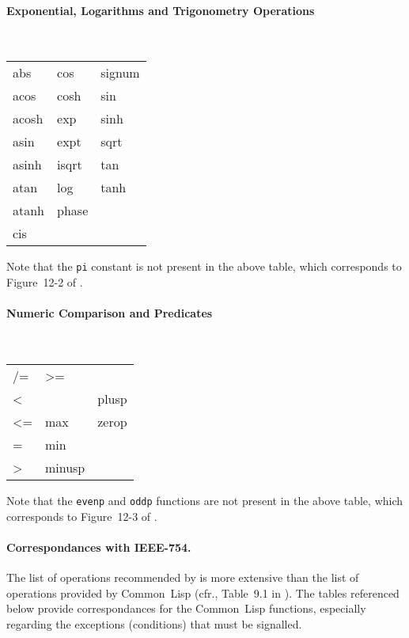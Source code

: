 \documentclass[10pt,fleqn]{article}
\newcommand{\CL}{\textsf{Common~Lisp}}
\newcommand{\code}[1]{\texttt{#1}}
\begin{document}
\paragraph{Exponential, Logarithms and Trigonometry Operations} ~\\

\begin{tt}
  \begin{tabular}{lll}
    abs & cos & signum\\
    acos &  cosh &  sin\\
    acosh & exp  &  sinh\\
    asin &  expt &  sqrt\\
    asinh & isqrt &  tan\\
    atan &  log &   tanh\\
    atanh & phase & \\
    cis & & \\
  \end{tabular}
\end{tt}

\vspace*{3mm}

\noindent
Note that the \code{pi} constant is not present in the above table, 
which corresponds to Figure~12-2 of \cite{ANSIHyperSpec}.


\paragraph{Numeric Comparison and Predicates} ~\\

\begin{tt}
  \begin{tabular}{lll}
    /= &  >= & \\
    < &   & plusp\\
    <= &  max & zerop\\
    = & min & \\
    > & minusp & \\
  \end{tabular}
\end{tt}

\vspace*{3mm}

\noindent
Note that the \code{evenp} and \code{oddp} functions are not present in the above table, 
which corresponds to Figure~12-3 of \cite{ANSIHyperSpec}.

\paragraph{Correspondances with IEEE-754.} The list of operations
recommended by \cite{IEEE-754} is more extensive than the list of
operations provided by \CL{} (cfr., Table~9.1 in \cite{IEEE-754}).
The tables referenced below provide correspondances for the \CL{} functions,
especially regarding the exceptions (conditions) that must be
signalled.
\end{document}
